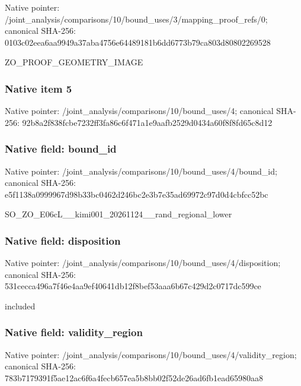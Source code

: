 \documentclass[10pt,a4paper]{article}
\begin{document}
Native pointer: /joint\_analysis/comparis\allowbreak{}ons/10/bound\_uses/3/mapp\allowbreak{}ing\_proof\_refs/0; canonical SHA-256: 0103c02eea6aa9949a37aba4\allowbreak{}756e64489181b6dd6773b79c\allowbreak{}a803d80802269528


ZO\_PROOF\_GEOMETRY\_IMAGE


\subsubsection{Native item 5}


Native pointer: /joint\_analysis/comparis\allowbreak{}ons/10/bound\_uses/4; canonical SHA-256: 92b8a2f838fcbe7232ff3fa8\allowbreak{}6c6f471a1e9aafb2529d0434\allowbreak{}a60f8f8fd65c8d12



\subsubsection{Native field: bound\_id}


Native pointer: /joint\_analysis/comparis\allowbreak{}ons/10/bound\_uses/4/boun\allowbreak{}d\_id; canonical SHA-256: e5f1138a0999967d98b33bc0\allowbreak{}462d246bc2e3b7e35ad69972\allowbreak{}c97d0d4cbfcc52bc


SO\_ZO\_E06cL\_\_kimi001\_202\allowbreak{}61124\_\_rand\_regional\_low\allowbreak{}er


\subsubsection{Native field: disposition}


Native pointer: /joint\_analysis/comparis\allowbreak{}ons/10/bound\_uses/4/disp\allowbreak{}osition; canonical SHA-256: 531cecca496a7f46e4aa9ef4\allowbreak{}0641db12f8bef53aaa6b67c4\allowbreak{}29d2c0717dc599ce


included


\subsubsection{Native field: validity\_region}


Native pointer: /joint\_analysis/comparis\allowbreak{}ons/10/bound\_uses/4/vali\allowbreak{}dity\_region; canonical SHA-256: 783b7179391f5ae12ac6f6a4\allowbreak{}fecb657ea5b8bb02f52de26a\allowbreak{}d6fb1ead65980aa8
\end{document}
